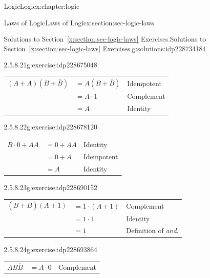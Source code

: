 \documentclass[twoside,10pt,]{book}
\newcommand{\tabularfont}{\relax}
\newcommand{\xreffont}{\relax}
\numberwithin{equation}{section}
\begin{document}
\begin{chapterptx}{Logic}{}{Logic}{}{}{x:chapter:logic}
\begin{sectionptx}{Laws of Logic}{}{Laws of Logic}{}{}{x:section:sec-logic-laws}
\begin{solutions-subsection}{Solutions to Section~{\xreffont\ref*{x:section:sec-logic-laws}} Exercises.}{}{Solutions to Section~{\xreffont\ref*{x:section:sec-logic-laws}} Exercises.}{}{}{g:solutions:idp228734184}
\begin{exercisegroup}
\end{exercisegroup}
\par\medskip\noindent
\begin{exercisegroup}
\begin{divisionsolutioneg}{2.5.8.21}{}{g:exercise:idp228675048}%
\par\smallskip%
\noindent\hypertarget{g:solution:idp228675944-main}{}\begin{center}%
{\tabularfont%
\begin{tabular}{lll}
\multicolumn{1}{c}{\((A+A)(B+\overline{B})\)}&\(= A(B+\overline{B})\)&Idempotent\tabularnewline[0pt]
&\(= A\cdot 1\)&Complement\tabularnewline[0pt]
&\(= A\)&Identity
\end{tabular}
}%
\end{center}%
\end{divisionsolutioneg}%
\begin{divisionsolutioneg}{2.5.8.22}{}{g:exercise:idp228678120}%
\par\smallskip%
\noindent\hypertarget{g:solution:idp228682856-main}{}\begin{center}%
{\tabularfont%
\begin{tabular}{lll}
\multicolumn{1}{c}{\(B\cdot 0+AA\)}&\(= 0+AA\)&Identity\tabularnewline[0pt]
&\(= 0+A\)&Idempotent\tabularnewline[0pt]
&\(= A\)&Identity
\end{tabular}
}%
\end{center}%
\end{divisionsolutioneg}%
\begin{divisionsolutioneg}{2.5.8.23}{}{g:exercise:idp228690152}%
\par\smallskip%
\noindent\hypertarget{g:solution:idp228690664-main}{}\begin{center}%
{\tabularfont%
\begin{tabular}{lll}
\multicolumn{1}{c}{\((B+\overline{B})(A+1)\)}&\(= 1\cdot(A+1)\)&Complement\tabularnewline[0pt]
&\(= 1\cdot 1\)&Identity\tabularnewline[0pt]
&\(= 1\)&Definition of \emph{and}.
\end{tabular}
}%
\end{center}%
\end{divisionsolutioneg}%
\begin{divisionsolutioneg}{2.5.8.24}{}{g:exercise:idp228693864}%
\par\smallskip%
\noindent\hypertarget{g:solution:idp228686696-main}{}\begin{center}%
{\tabularfont%
\begin{tabular}{lll}
\multicolumn{1}{c}{\(AB\overline{B}\)}&\(=A\cdot 0\)&Complement\tabularnewline[0pt]

\end{tabular}}
\end{center}
\end{divisionsolutioneg}
\end{exercisegroup}
\end{solutions-subsection}
\end{sectionptx}
\end{chapterptx}
\end{document}
